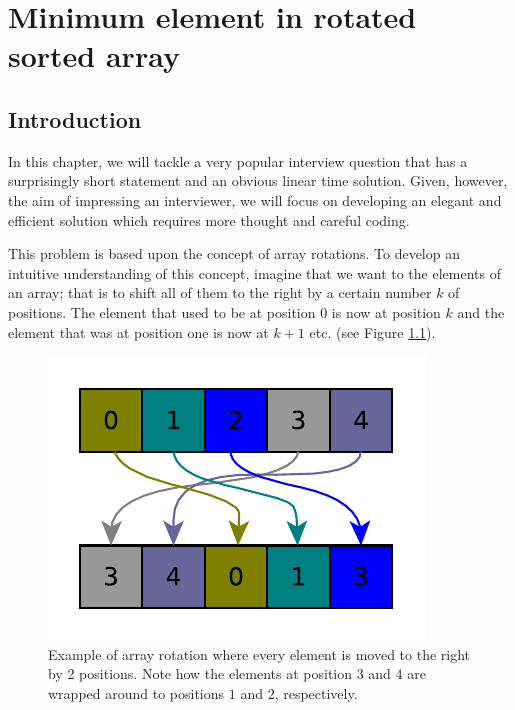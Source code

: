 %

\chapter{Minimum element in rotated sorted array}
\label{ch:min_rotated_array}
\section*{Introduction}
In this chapter, we will tackle a very popular interview question that has a surprisingly short statement and an obvious linear time solution. Given, however, the aim of impressing an interviewer, we will focus on developing an elegant and efficient solution which requires more thought and careful coding.

This problem is based upon the concept of array rotations. To develop an intuitive understanding of this concept, imagine that we want to  the elements of an array; that is to shift all of them to the right by a certain number $k$ of positions. The element that used to be at position $0$ is now at position $k$ and the element that was at position one is now at $k+1$ etc. (see Figure \ref{fig:min_rotated_array:arrayrotation}).

\begin{figure}
	\centering
	\includegraphics{sources/min_rotated_array/images/arrayrotation}
	\caption{Example of array rotation where every element is moved to the right by 2 positions. Note how  the elements at position $3$ and $4$ are wrapped around to positions $1$ and $2$, respectively.}
	\label{fig:min_rotated_array:arrayrotation}
\end{figure}


